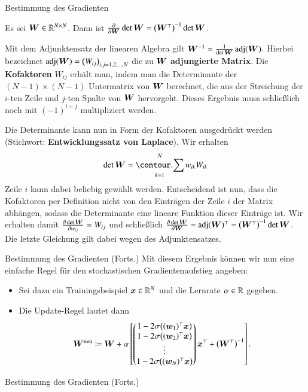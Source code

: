 \begin{frame}{Bestimmung des Gradienten}{}
	\begin{mytheo}
		Es sei $\bm{W} \in \mathbb{R}^{N \times N}$. Dann ist
		$\frac{\partial}{\partial \bm{W}} \det \bm{W} = \bigl( \bm{W}^\top \bigr)^{-1} \det \bm{W}$.
	\end{mytheo}

	\begin{myproof}
		Mit dem Adjunktensatz der linearen Algebra gilt $\bm{W}^{-1} = \frac{1}{\det \bm{W}} \operatorname{\text{adj}}(\bm{W})$.
		Hierbei bezeichnet $\operatorname{\text{adj}}(\bm{W}) = \bigl( W_{ij} \bigr)_{i,j = 1, 2, \ldots, N}$ die zu $\bm{W}$ \textbf{adjungierte Matrix}.
		Die \textbf{Kofaktoren} $W_{ij}$ erhält man, indem man die Determinante der
		$(N - 1) \times (N - 1)$ Untermatrix von $\bm{W}$ berechnet, die aus der Streichung der $i$-ten Zeile und $j$-ten Spalte
		von $\bm{W}$ hervorgeht. Dieses Ergebnis muss schließlich noch mit $(-1)^{i + j}$ multipliziert werden.
		
		Die Determinante kann nun in Form der Kofaktoren ausgedrückt werden
		(Stichwort: \textbf{Entwicklungssatz von Laplace}). Wir erhalten
		\begin{equation*}
			\det \bW = \sum_{k = 1}^N w_{ik} W_{ik}
		\end{equation*}
		Zeile $i$ kann dabei beliebig gewählt werden. Entscheidend ist nun, dass die Kofaktoren per Definition
		nicht von den Einträgen der Zeile $i$ der Matrix abhängen, sodass die Determinante eine lineare Funktion
		dieser Einträge ist. Wir erhalten damit
		$\frac{\partial \det \bm{W}}{\partial w_{ij}} = W_{ij}$ und schließlich
		$\frac{\partial \det \bm{W}}{\partial \bm{W}} = \operatorname{\text{adj}}(\bm{W})^\top = \bigl( \bm{W}^\top \bigr)^{-1} \det \bm{W}$.
		Die letzte Gleichung gilt dabei wegen des Adjunktensatzes.
	\end{myproof}
\end{frame}


\begin{frame}{Bestimmung des Gradienten (Forts.)}{}
	Mit diesem Ergebnis können wir nun eine einfache Regel für den stochastischen Gradientenaufstieg angeben:
	\begin{itemize}
		\item Sei dazu ein Trainingsbeispiel $\bm{x} \in \mathbb{R}^N$  und die Lernrate $\alpha \in \mathbb{R}$ gegeben.
		\item Die Update-Regel lautet dann
		\begin{equation}
			\bm{W}^{\text{neu}} \coloneqq \bm{W} + \alpha \left[
				\begin{pmatrix}
					1 - 2 \sigma\bigl( (\bm{w}_1)^\top \bm{x} \bigr) \\
					1 - 2 \sigma\bigl( (\bm{w}_2)^\top \bm{x} \bigr) \\
					\vdots \\
					1 - 2 \sigma\bigl( (\bm{w}_N)^\top \bm{x} \bigr)
				\end{pmatrix} \bm{x}^\top + \bigl( \bm{W}^\top \bigr)^{-1}
			\right].
		\end{equation}
	\end{itemize}
\end{frame}


\begin{frame}{Bestimmung des Gradienten (Forts.)}{}
	\begin{myproof}

	\end{myproof}
\end{frame}